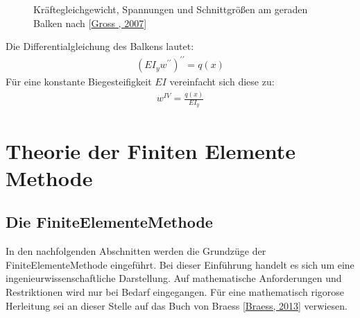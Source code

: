 \documentclass[letterpaper,10pt,german]{jupyterBook}
\let\sphinxpxdimen\pdfpxdimen\else\newdimen\sphinxpxdimen
\begin{document}
\begin{figure}[htbp]
\centering
\capstart

\noindent\sphinxincludegraphics[width=600\sphinxpxdimen]{{Balken_TM2}.png}
\caption{Kräftegleichgewicht, Spannungen und Schnittgrößen am geraden Balken nach {[}\hyperlink{cite.quellen:id13}{Gross , 2007}{]}}\label{\detokenize{chapters/chapter1/strukturgleichungen:balken}}\end{figure}

\sphinxAtStartPar
Die Differentialgleichung des Balkens lautet:
\begin{equation}\label{equation:chapters/chapter1/strukturgleichungen:balkendgl}
\begin{split} \left(E I_y w^{\prime \prime}\right)^{\prime\prime} =  q(x)\end{split}
\end{equation}
\sphinxAtStartPar
Für eine konstante Biegesteifigkeit \(EI\) vereinfacht sich diese zu:
\begin{equation}\label{equation:chapters/chapter1/strukturgleichungen:balkendglsimple}
\begin{split}  w^{IV} =  \frac{q(x)}{E I_y}\end{split}
\end{equation}
\sphinxstepscope


\part{Theorie der Finiten Elemente Methode}

\sphinxstepscope


\chapter{Die Finite\sphinxhyphen{}Elemente\sphinxhyphen{}Methode}
\label{\detokenize{chapters/chapter2/overview:die-finite-elemente-methode}}\label{\detokenize{chapters/chapter2/overview::doc}}
\sphinxAtStartPar
In den nachfolgenden Abschnitten werden die Grundzüge der Finite\sphinxhyphen{}Elemente\sphinxhyphen{}Methode eingeführt. Bei dieser Einführung handelt es sich um eine ingenieurwissenschaftliche Darstellung. Auf mathematische Anforderungen und Restriktionen wird nur bei Bedarf eingegangen. Für eine mathematisch rigorose Herleitung sei an dieser Stelle auf das Buch von Braess {[}\hyperlink{cite.quellen:id14}{Braess, 2013}{]} verwiesen.

\sphinxstepscope
\end{document}
